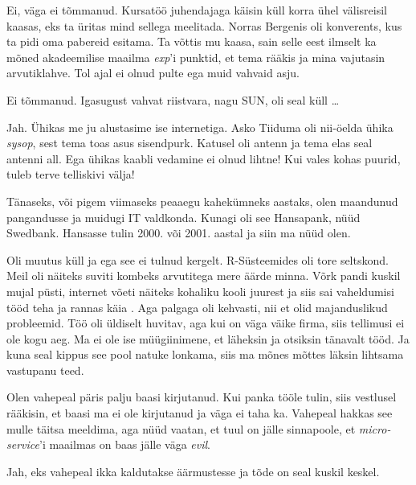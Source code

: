 
Ei, väga ei tõmmanud. Kursatöö juhendajaga käisin küll korra ühel 
välisreisil kaasas, eks ta üritas mind sellega meelitada. Norras 
Bergenis oli konverents, kus ta pidi oma pabereid esitama. Ta võttis mu kaasa, sain selle 
eest ilmselt ka mõned akadeemilise maailma \emph{exp}'i punktid, et tema rääkis ja mina vajutasin 
arvutiklahve. Tol ajal ei olnud pulte ega muid vahvaid asju. 


Ei tõmmanud. Igasugust vahvat riistvara, 
nagu SUN, oli seal küll \ldots 


Jah. Ühikas me ju alustasime ise internetiga. Asko 
Tiiduma oli nii-öelda ühika \emph{sysop}, sest tema 
toas asus sisendpurk. Katusel oli antenn ja tema elas seal antenni 
all. Ega ühikas kaabli vedamine ei olnud lihtne! Kui vales kohas puurid, tuleb terve telliskivi välja!


Tänaseks, või pigem viimaseks peaaegu kahekümneks aastaks, olen maandunud 
pangandusse ja muidugi IT valdkonda. Kunagi oli see Hansapank, 
nüüd Swedbank. Hansasse tulin 2000. või 2001. aastal ja siin ma nüüd olen.


Oli muutus küll ja ega see ei tulnud kergelt. R-Süsteemides oli tore 
seltskond. Meil oli näiteks suviti kombeks arvutitega 
mere äärde minna. Võrk pandi kuskil mujal püsti, internet võeti näiteks kohaliku kooli juurest ja siis sai vaheldumisi tööd teha ja rannas käia . Aga palgaga oli kehvasti, nii et olid majanduslikud probleemid. Töö oli üldiselt 
huvitav, aga kui on väga väike firma, siis tellimusi ei ole kogu aeg. Ma ei 
ole ise müügiinimene, et läheksin ja otsiksin tänavalt tööd. Ja kuna seal 
kippus see pool natuke lonkama, siis ma mõnes mõttes läksin 
lihtsama vastupanu teed. 

Olen vahepeal päris palju baasi 
kirjutanud. Kui panka tööle tulin, siis vestlusel rääkisin, 
et baasi ma ei ole kirjutanud ja väga ei taha ka. Vahepeal hakkas 
see mulle täitsa meeldima, aga nüüd vaatan, et tuul on jälle sinnapoole, et \emph{micro-service}'i maailmas on baas jälle väga \emph{evil}. 


Jah, eks vahepeal ikka kaldutakse äärmustesse ja tõde on seal kuskil 
keskel.